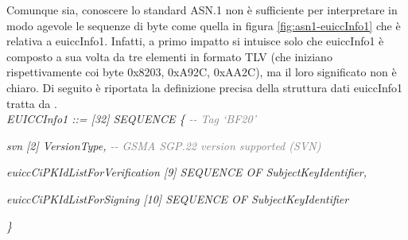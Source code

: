 \documentclass[10pt, oneside]{book}
\begin{document}
Comunque sia, conoscere lo standard ASN.1 non è sufficiente per interpretare in modo agevole le sequenze di byte come quella in figura \ref{fig:asn1-euiccInfo1} che è relativa a euiccInfo1. Infatti, a primo impatto si intuisce solo che euiccInfo1 è composto a sua volta da tre elementi in formato TLV (che iniziano rispettivamente coi byte 0x8203, 0xA92C, 0xAA2C), ma il loro significato non è chiaro. Di seguito è riportata la definizione precisa della struttura dati euiccInfo1 tratta da \cite{RSP-definitions}.\\

\textit{EUICCInfo1 ::= [32] SEQUENCE \{ \textcolor{gray}{{-}{-} Tag `BF20'}}

\hspace{0.75cm} \textit{svn [2] VersionType, \textcolor{gray}{{-}{-} GSMA SGP.22 version supported (SVN)}}

\hspace{0.75cm} \textit{euiccCiPKIdListForVerification [9] SEQUENCE OF SubjectKeyIdentifier,}

\hspace{0.75cm} \textit{euiccCiPKIdListForSigning [10] SEQUENCE OF SubjectKeyIdentifier}

\textit{\}\\}
\end{document}
